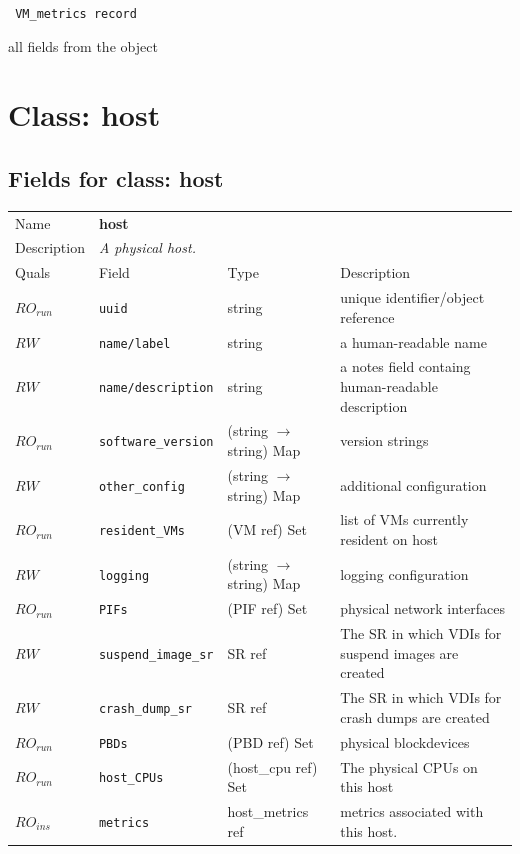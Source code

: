 \vspace{0.3cm}

{\tt 
VM\_metrics record
}


all fields from the object
\vspace{0.3cm}
\vspace{0.3cm}
\vspace{0.3cm}

\vspace{1cm}
\newpage
\section{Class: host}
\subsection{Fields for class: host}
\begin{longtable}{|lllp{}|}
\hline
\multicolumn{1}{|l}{Name} & \multicolumn{3}{l|}{\bf host} \\
\multicolumn{1}{|l}{Description} & \multicolumn{3}{l|}{\parbox{11cm}{\em A
physical host.}} \\
\hline
Quals & Field & Type & Description \\
\hline
$\mathit{RO}_\mathit{run}$ &  {\tt uuid} & string & unique identifier/object reference \\
$\mathit{RW}$ &  {\tt name/label} & string & a human-readable name \\
$\mathit{RW}$ &  {\tt name/description} & string & a notes field containg human-readable description \\
$\mathit{RO}_\mathit{run}$ &  {\tt software\_version} & (string $\rightarrow$ string) Map & version strings \\
$\mathit{RW}$ &  {\tt other\_config} & (string $\rightarrow$ string) Map & additional configuration \\
$\mathit{RO}_\mathit{run}$ &  {\tt resident\_VMs} & (VM ref) Set & list of VMs currently resident on host \\
$\mathit{RW}$ &  {\tt logging} & (string $\rightarrow$ string) Map & logging configuration \\
$\mathit{RO}_\mathit{run}$ &  {\tt PIFs} & (PIF ref) Set & physical network interfaces \\
$\mathit{RW}$ &  {\tt suspend\_image\_sr} & SR ref & The SR in which VDIs for suspend images are created \\
$\mathit{RW}$ &  {\tt crash\_dump\_sr} & SR ref & The SR in which VDIs for crash dumps are created \\
$\mathit{RO}_\mathit{run}$ &  {\tt PBDs} & (PBD ref) Set & physical blockdevices \\
$\mathit{RO}_\mathit{run}$ &  {\tt host\_CPUs} & (host\_cpu ref) Set & The physical CPUs on this host \\
$\mathit{RO}_\mathit{ins}$ &  {\tt metrics} & host\_metrics ref & metrics associated with this host. \\
\hline
\end{longtable}
